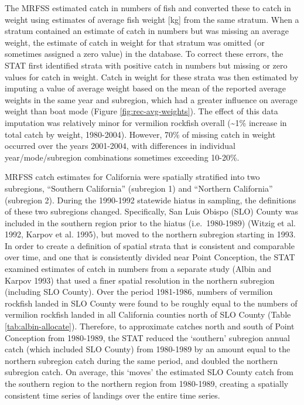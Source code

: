 \documentclass[
  english,
  a4paper,
]{article}
\begin{document}
The MRFSS estimated catch in numbers of fish and converted these to catch in
weight using estimates of average fish weight {[}kg{]} from the same stratum. When
a stratum contained an estimate of catch in numbers but was missing an average
weight, the estimate of catch in weight for that stratum was omitted (or sometimes
assigned a zero value) in the database. To correct these errors, the STAT first
identified strata with positive catch in numbers but missing or zero values for
catch in weight. Catch in weight for these strata was then estimated by imputing
a value of average weight based on the mean of the reported average weights in
the same year and subregion, which had a greater influence on average
weight than boat mode (Figure \ref{fig:rec-avg-weights}). The effect of this
data imputation was relatively
minor for vermilion rockfish overall (\textasciitilde1\% increase in total catch by weight,
1980-2004). However, 70\% of missing catch in weight occurred over the years
2001-2004, with differences in individual year/mode/subregion combinations
sometimes exceeding 10-20\%.

MRFSS catch estimates for California were spatially stratified into two subregions,
``Southern California'' (subregion 1) and ``Northern California'' (subregion 2).
During the 1990-1992 statewide hiatus in sampling, the definitions of these two
subregions changed. Specifically, San Luis Obispo (SLO) County was included in
the southern region prior to the hiatus (i.e.~1980-1989) (Witzig et al. 1992, Karpov et al. 1995),
but moved to the northern subregion starting in 1993. In order to create a
definition of spatial strata that is consistent and comparable over time, and
one that is consistently divided near Point Conception, the STAT examined
estimates of catch in numbers from a separate study (Albin and Karpov 1993) that used a
finer spatial
resolution in the northern subregion (including SLO County). Over the period
1981-1986, numbers of vermilion rockfish landed in SLO County were found to
be roughly equal to the numbers of vermilion rockfish landed in all California
counties north of SLO County (Table \ref{tab:albin-allocate}). Therefore, to
approximate catches north and south of Point Conception from 1980-1989, the STAT
reduced the `southern' subregion annual catch (which included SLO County) from
1980-1989 by an amount
equal to the northern subregion catch during the same period, and doubled the
northern subregion catch. On average, this `moves' the estimated SLO County
catch from the southern region to the northern region from 1980-1989, creating
a spatially consistent time series of landings over the entire time series.
\end{document}
